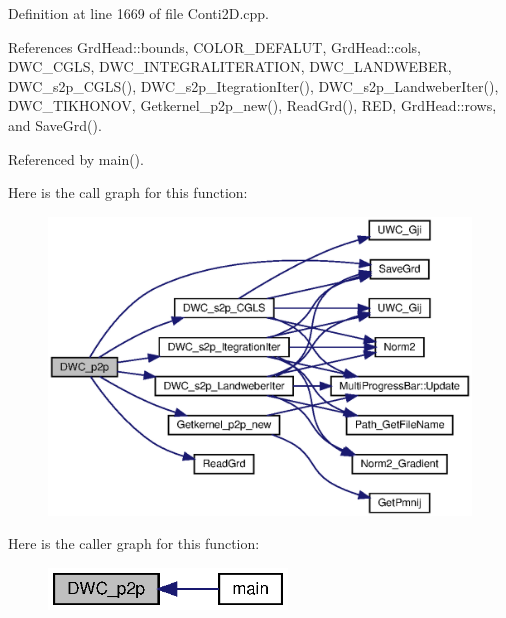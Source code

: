 Definition at line 1669 of file Conti2\+D.\+cpp.



References Grd\+Head\+::bounds, C\+O\+L\+O\+R\+\_\+\+D\+E\+F\+A\+L\+UT, Grd\+Head\+::cols, D\+W\+C\+\_\+\+C\+G\+LS, D\+W\+C\+\_\+\+I\+N\+T\+E\+G\+R\+A\+L\+I\+T\+E\+R\+A\+T\+I\+ON, D\+W\+C\+\_\+\+L\+A\+N\+D\+W\+E\+B\+ER, D\+W\+C\+\_\+s2p\+\_\+\+C\+G\+L\+S(), D\+W\+C\+\_\+s2p\+\_\+\+Itegration\+Iter(), D\+W\+C\+\_\+s2p\+\_\+\+Landweber\+Iter(), D\+W\+C\+\_\+\+T\+I\+K\+H\+O\+N\+OV, Getkernel\+\_\+p2p\+\_\+new(), Read\+Grd(), R\+ED, Grd\+Head\+::rows, and Save\+Grd().



Referenced by main().

Here is the call graph for this function\+:
\nopagebreak
\begin{figure}[H]
\begin{center}
\leavevmode
\includegraphics[width=350pt]{Conti2D_8cpp_ab87ce573de93575b7ece2e4f772e03fd_ab87ce573de93575b7ece2e4f772e03fd_cgraph}
\end{center}
\end{figure}
Here is the caller graph for this function\+:\nopagebreak
\begin{figure}[H]
\begin{center}
\leavevmode
\includegraphics[width=180pt]{Conti2D_8cpp_ab87ce573de93575b7ece2e4f772e03fd_ab87ce573de93575b7ece2e4f772e03fd_icgraph}
\end{center}
\end{figure}
\mbox{\label{Conti2D_8cpp_a68e9e4a8817a29dce16c782fa8213faa_a68e9e4a8817a29dce16c782fa8213faa}} 
